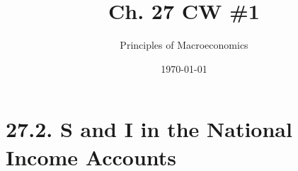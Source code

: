 \documentclass{article}
\title{Ch. 27 CW \#1}
\author{Principles of Macroeconomics}
\date{\today}
\begin{document}
\maketitle


\section*{27.2. S and I in the National Income Accounts}
\end{document}
